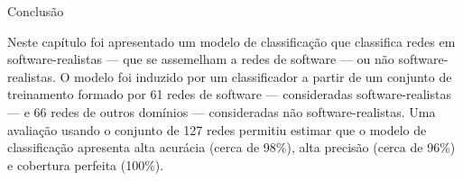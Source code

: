 \begin{section}{Conclusão} \label{cap:clas5}

	Neste capítulo foi apresentado um modelo de classificação que classifica redes em software-realistas --- que se assemelham a redes de software --- ou não software-realistas. O modelo foi induzido por um classificador a partir de um conjunto de treinamento formado por 61 redes de software --- consideradas software-realistas --- e 66 redes de outros domínios --- consideradas não software-realistas. Uma avaliação usando o conjunto de 127 redes permitiu estimar que o modelo de classificação apresenta alta acurácia (cerca de 98\%), alta precisão (cerca de 96\%) e cobertura perfeita (100\%). 

	
\end{section}

